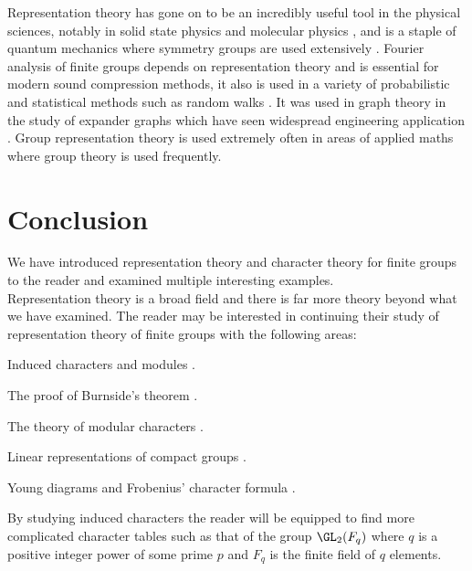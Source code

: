 Representation theory has gone on to be an incredibly useful tool in the physical sciences, notably in solid state physics and molecular physics \cite[page 78]{11}, and is a staple of quantum mechanics where symmetry groups are used extensively \cite[page 187]{12}. Fourier analysis of finite groups depends on representation theory and is essential for modern sound compression methods, it also is used in a variety of probabilistic and statistical methods such as random walks \cite[Chapter 11]{1}. It was used in graph theory in the study of expander graphs which have seen widespread engineering application \cite[page 3]{13}. Group representation theory is used extremely often in areas of applied maths where group theory is used frequently.





%





\newpage
\section{Conclusion}
We have introduced representation theory and character theory for finite groups to the reader and examined multiple interesting examples.\\

Representation theory is a broad field and there is far more theory beyond what we have examined. The reader may be interested in continuing their study of representation theory of finite groups with the following areas:
\begin{mitem}
\item Induced characters and modules \cite[Chapter 21]{2}.
\item The proof of Burnside's theorem \cite[Chapter 31]{2}.
\item The theory of modular characters \cite[Chapter 18]{6}.
\item Linear representations of compact groups \cite[Chapter 4]{6}.
\item Young diagrams and Frobenius' character formula \cite[Chapter 4]{16}.\\
\end{mitem}

By studying induced characters the reader will be equipped to find more complicated character tables such as that of the group $\GL_2(F_q)$ where $q$ is a positive integer power of some prime $p$ and $F_q$ is the finite field of $q$ elements.\\


